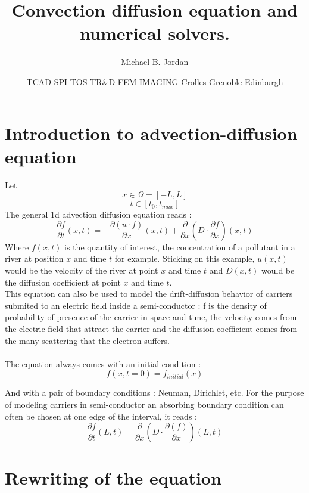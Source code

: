 \documentclass[11pt,a4paper]{article}
\title{Convection diffusion equation and numerical solvers.}
\author[1]{Michael B. Jordan}
\author[2]{TCAD SPI TOS TR\&D FEM IMAGING Crolles Grenoble Edinburgh}
\affil[1]{Chicago Bulls}
\affil[2]{ST Microelectronics}
\date{}                     %
\begin{document}
\maketitle

\tableofcontents

\section{Introduction to advection-diffusion equation}
Let \[x \in \Omega = [-L, L] \] \[t \in [t_0, t_{max}]\]
The general 1d advection diffusion equation reads : 
\begin{equation}\label{eq:GeneralAD}
\frac{\partial f}{\partial t}(x,t) = 
	- \frac{\partial( u \cdot f )}{\partial x}(x,t)
	+ \frac{\partial}{\partial x}\left(D \cdot \frac{\partial f }{\partial x}\right)(x,t)
\end{equation}
Where $f(x, t)$ is the quantity of interest, the concentration of a pollutant in a river at position $x$ and time $t$ for example.
Sticking on this example, $u(x,t)$ would be the velocity of the river at point $x$ and time $t$ and $D(x,t)$ would be the diffusion coefficient at point $x$ and time $t$. \\
This equation can also be used to model the drift-diffusion behavior of carriers submited to an electric field inside a semi-conductor : f is the density of probability of presence of the carrier in space and time, the velocity comes from the electric field that attract the carrier and the diffusion coefficient comes from the many scattering that the electron suffers. \\ \\

The equation always comes with an initial condition : 
\begin{equation}
f(x, t=0) = f_{initial}(x) 
\end{equation}

And with a pair of boundary conditions : Neuman, Dirichlet, etc.
For the purpose of modeling carriers in semi-conductor an absorbing boundary condition can often be chosen at one edge of the interval, it reads : 
\begin{equation}
\frac{\partial f}{\partial t}(L,t) = 
	\frac{\partial}{\partial x}\left(D \cdot \frac{\partial( f )}{\partial x}\right)(L,t)
\end{equation}


\section{Rewriting of the equation}
\end{document}
